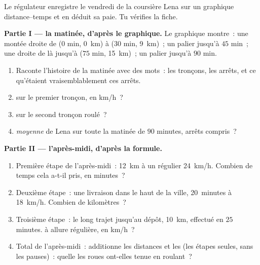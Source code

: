 \begin{problem}\label{pb:g7:motion-average-speed:1}
Le régulateur enregistre le vendredi de la coursière Lena sur un
graphique distance--temps et en déduit sa paie. Tu vérifies la
fiche.

\medskip\noindent\textbf{Partie I --- la matinée, d'après le
graphique.}
Le graphique montre~: une montée droite de ($0$ min, \qty{0}{km})
à ($30$ min, \qty{9}{km})~; un palier jusqu'à $45$ min~; une droite
de là jusqu'à ($75$ min, \qty{15}{km})~; un palier jusqu'à $90$ min.
\begin{enumerate}
  \item Raconte l'histoire de la matinée avec des mots~: les
        tronçons, les arrêts, et ce qu'étaient vraisemblablement
        ces arrêts.
  \item {} sur le premier tronçon, en \unit{km/h}~?
  \item {} sur le second tronçon roulé~?
  \item {} \emph{moyenne} de Lena sur toute la matinée de $90$
        minutes, arrêts compris~?
\end{enumerate}

\medskip\noindent\textbf{Partie II --- l'après-midi, d'après la
formule.}
\begin{enumerate}[resume]
  \item Première étape de l'après-midi~: \qty{12}{km} à un régulier
        \qty{24}{km/h}. Combien de temps cela a-t-il pris, en
        minutes~?
  \item Deuxième étape~: une livraison dans le haut de la ville,
        \qty{20}{minutes} à \qty{18}{km/h}. Combien de kilomètres~?
  \item Troisième étape~: le long trajet jusqu'au dépôt,
        \qty{10}{km}, effectué en $25$ minutes.  à allure
        régulière, en \unit{km/h}~?
  \item Total de l'après-midi~: additionne les distances et les
         (les étapes seules, sans les pauses)~: quelle
         les roues ont-elles tenue en roulant~?
\end{enumerate}


\end{problem}
